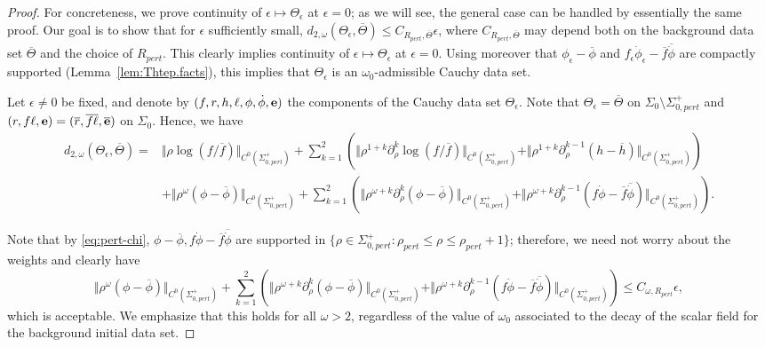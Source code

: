 \documentclass[10pt, reqno]{amsart}
\theoremstyle{definition}
\theoremstyle{remark}
\theoremstyle{conjecture}
\numberwithin{equation}{section}
\newcommand{\nrm}[1]{\Vert#1\Vert}
\newcommand{\set}[1]{\{#1\}}
\newcommand{\rd}{\partial}
\newcommand{\0}{\emptyset}
\newcommand{\eps}{\epsilon}
\newcommand{\Sgm}{\Sigma}
\newcommand{\Tht}{\Theta}
\newcommand{\omg}{\omega}
\newcommand{\bfe}{{\bf e}}
\newcommand{\e}{\bfe}							%
\newcommand{\phibg}{\overline{\phi}}				%
\newcommand{\rbg}{\overline{r}}					%
\newcommand{\ebg}{\overline{\e}}					%
\newcommand{\fbg}{\overline{f}}
\newcommand{\hbg}{\overline{h}}
\newcommand{\ellbg}{\overline{\ell}}
\begin{document}
\begin{proof}
For concreteness, we prove continuity of $\eps \mapsto \Tht_{\eps}$ at $\eps = 0$; as we will see, the general case can be handled by essentially the same proof. Our goal is to show that for $\eps$ sufficiently small, $d_{2, \omg} (\Tht_{\eps}, \overline{\Tht})\leq C_{R_{pert}, \overline{\Tht}} \eps$, where $C_{R_{pert}, \overline{\Tht}}$ may depend both on the background data set $\overline{\Tht}$ and the choice of $R_{pert}$. This clearly implies continuity of $\eps \mapsto \Tht_{\eps}$ at $\eps = 0$. Using moreover that $\phi_{\eps}-\phibg$ and $f_{\eps}\dot{\phi}_{\eps}-\fbg \overline{\dot{\phi}}$ are compactly supported (Lemma~\ref{lem:Thtep.facts}), this implies that $\Tht_{\eps}$ is an $\omg_{0}$-admissible Cauchy data set.

Let $\eps \neq 0$ be fixed, and denote by $(f, r, h, \ell, \phi, \dot{\phi}, \e)$ the components of the Cauchy data set $\Tht_{\eps}$. Note that $\Tht_{\eps} = \overline{\Tht}$ on $\Sgm_{0} \setminus \Sgm_{0, pert}^{+}$ and $(r, f \ell, \e) = (\rbg, \fbg \ellbg, \ebg)$ on $\Sgm_{0}$.
Hence, we have
\begin{align*}
	d_{2, \omg} (\Tht_{\eps}, \overline{\Tht})
	= & \nrm{\rho \log(f/ \fbg)}_{C^{0}(\Sgm_{0, pert}^{+})}
	 + \sum_{k=1}^{2} \left( \nrm{\rho^{1+k} \rd_{\rho}^{k} \log(f/ \fbg)}_{C^{0}(\Sgm_{0, pert}^{+})}
					+ \nrm{\rho^{1+k} \rd_{\rho}^{k-1} (h - \hbg)}_{C^{0}(\Sgm_{0, pert}^{+})} \right) \\
	& + \nrm{\rho^{\omg} (\phi - \phibg)}_{C^{0}(\Sgm_{0, pert}^{+})} 
	+ \sum_{k=1}^{2} \left( \nrm{\rho^{\omg+k} \rd^{k}_{\rho} (\phi - \phibg)}_{C^{0}(\Sgm_{0, pert}^{+})}
					+ \nrm{\rho^{\omg+k} \rd^{k-1}_{\rho}(f \dot{\phi} - \overline{f}\overline{\dot{\phi}})}_{C^{0}(\Sgm_{0, pert}^{+})} \right).
\end{align*}


Note that by \eqref{eq:pert-chi}, $\phi - \phibg, f \dot{\phi} - \fbg \overline{\dot{\phi}}$ are supported in $\set{\rho \in \Sgm_{0, pert}^{+} : \rho_{pert} \leq \rho \leq \rho_{pert} + 1}$; therefore, we need not worry about the weights and clearly have
\begin{equation*}
\nrm{\rho^{\omg} (\phi - \phibg)}_{C^{0}(\Sgm_{0, pert}^{+})} 
+ \sum_{k=1}^{2} \left( \nrm{\rho^{\omg+k} \rd^{k}_{\rho} (\phi - \phibg)}_{C^{0}(\Sgm_{0, pert}^{+})}
					+ \nrm{\rho^{\omg+k} \rd^{k-1}_{\rho}(f \dot{\phi} - \fbg \overline{\dot{\phi}})}_{C^{0}(\Sgm_{0, pert}^{+})} \right)
\leq C_{\omg, R_{pert}} \eps,
\end{equation*}
which is acceptable. We emphasize that this holds for all $\omg>2$, regardless of the value of $\omg_0$ associated to the decay of the scalar field for the background initial data set.


\end{proof}
\end{document}
